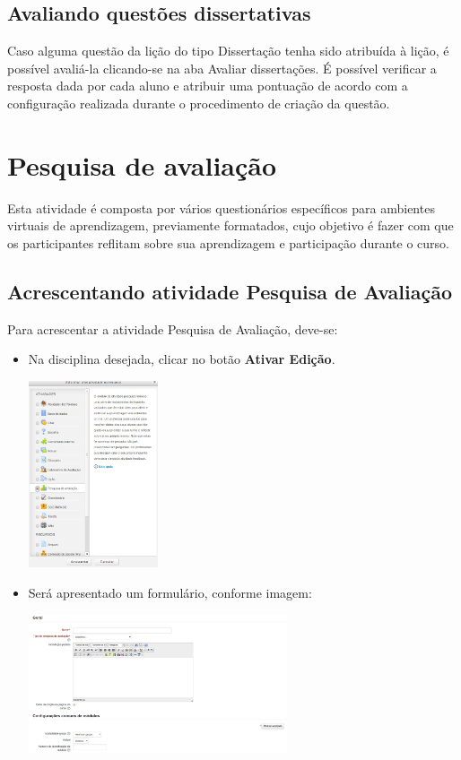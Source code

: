 \subsection{Avaliando questões dissertativas}
Caso alguma questão da lição do tipo Dissertação tenha sido atribuída à lição, é possível avaliá-la clicando-se na aba Avaliar dissertações. É possível verificar a resposta dada por cada aluno e atribuir uma pontuação de acordo com a configuração realizada durante o procedimento de criação da questão.

\section{Pesquisa de avaliação}
Esta atividade é composta por vários questionários específicos para ambientes virtuais de aprendizagem, previamente formatados, cujo objetivo é fazer com que os participantes reflitam sobre sua aprendizagem e participação durante o curso.

\subsection{Acrescentando atividade Pesquisa de Avaliação}

Para acrescentar a atividade Pesquisa de Avaliação, deve-se:

\begin{itemize}
\item Na disciplina desejada, clicar no botão \textbf{Ativar Edição}.

\begin{center}\includegraphics[width=0.3\textwidth]{imagem/cap5/fig58.jpg}\end{center}

\item Será apresentado um formulário, conforme imagem:

\begin{center}\includegraphics[width=0.6\textwidth]{imagem/cap5/fig59.jpg}\end{center}
\end{itemize}

